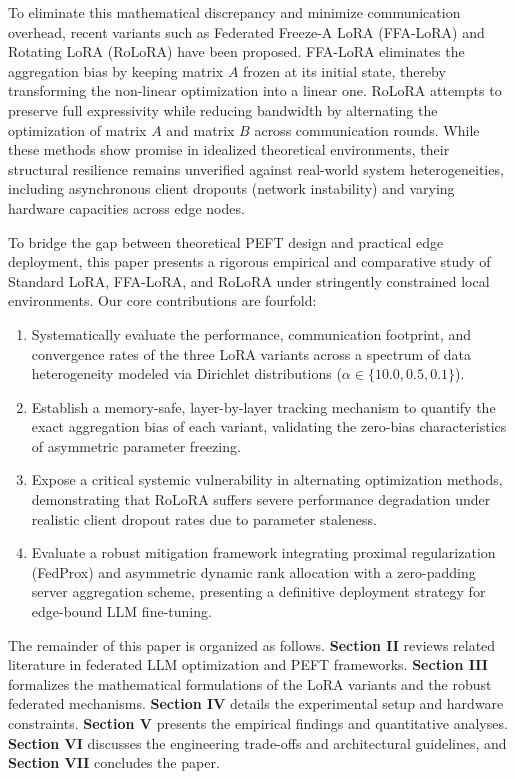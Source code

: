 \documentclass[journal]{IEEEtran}
\begin{document}
To eliminate this mathematical discrepancy and minimize communication overhead, recent variants such as Federated Freeze-A LoRA (FFA-LoRA) \cite{ffa_lora_paper} and Rotating LoRA (RoLoRA) \cite{rolora_paper} have been proposed. FFA-LoRA eliminates the aggregation bias by keeping matrix $A$ frozen at its initial state, thereby transforming the non-linear optimization into a linear one. RoLoRA attempts to preserve full expressivity while reducing bandwidth by alternating the optimization of matrix $A$ and matrix $B$ across communication rounds. While these methods show promise in idealized theoretical environments, their structural resilience remains unverified against real-world system heterogeneities, including asynchronous client dropouts (network instability) and varying hardware capacities across edge nodes.



To bridge the gap between theoretical PEFT design and practical edge deployment, this paper presents a rigorous empirical and comparative study of Standard LoRA, FFA-LoRA, and RoLoRA under stringently constrained local environments. Our core contributions are fourfold:
\begin{enumerate}
    \item Systematically evaluate the performance, communication footprint, and convergence rates of the three LoRA variants across a spectrum of data heterogeneity modeled via Dirichlet distributions ($\alpha \in \{10.0, 0.5, 0.1\}$).
    \item Establish a memory-safe, layer-by-layer tracking mechanism to quantify the exact aggregation bias of each variant, validating the zero-bias characteristics of asymmetric parameter freezing.
    \item Expose a critical systemic vulnerability in alternating optimization methods, demonstrating that RoLoRA suffers severe performance degradation under realistic client dropout rates due to parameter staleness.
    \item Evaluate a robust mitigation framework integrating proximal regularization (FedProx) \cite{li2020federated} and asymmetric dynamic rank allocation with a zero-padding server aggregation scheme, presenting a definitive deployment strategy for edge-bound LLM fine-tuning.
\end{enumerate}


The remainder of this paper is organized as follows. \textbf{Section II} reviews related literature in federated LLM optimization and PEFT frameworks. \textbf{Section III} formalizes the mathematical formulations of the LoRA variants and the robust federated mechanisms. \textbf{Section IV} details the experimental setup and hardware constraints. \textbf{Section V} presents the empirical findings and quantitative analyses. \textbf{Section VI} discusses the engineering trade-offs and architectural guidelines, and \textbf{Section VII} concludes the paper.
\end{document}
